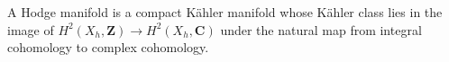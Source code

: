 A Hodge manifold is a compact Kähler manifold whose Kähler class lies in the image of $H^2(X_h, \mathbf{Z}) \rightarrow H^2(X_h, \mathbf{C})$ under the natural map from integral cohomology to complex cohomology.
